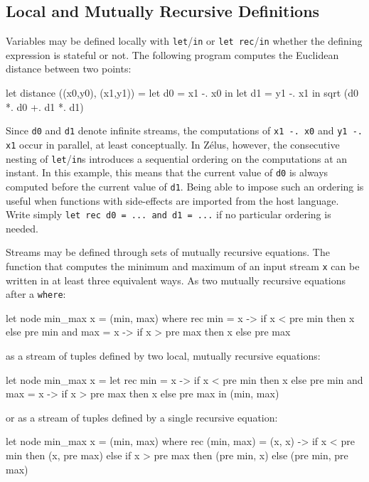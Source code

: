 \documentclass[11pt,titlepage,twoside]{report}
\newcommand{\zls}[1]{\texttt{#1}}
\begin{document}

\subsection{Local and Mutually Recursive Definitions\label{localdefmut}} %

Variables may be defined locally with \zls{let}/\zls{in} or
\zls{let rec}/\zls{in} whether the defining expression is stateful or not.
The following
program computes the Euclidean distance between two points:%
\begin{chklisting}
let distance ((x0,y0), (x1,y1)) =
  let d0 = x1 -. x0 in
  let d1 = y1 -. x1 in
  sqrt (d0 *. d0 +. d1 *. d1)
\end{chklisting}
Since \zls{d0} and \zls{d1} denote infinite streams, the computations of 
\verb+x1 -. x0+ and \verb+y1 -. x1+ occur in parallel, at least 
conceptually.
In Zélus, however, the consecutive nesting of \zls{let}/\zls{in}s introduces 
a sequential ordering on the computations at an instant.
In this example, this means that the current value of \zls{d0} is always 
computed before the current value of \zls{d1}.
Being able to impose such an ordering is useful when functions with 
side-effects are imported from the host language.
Write simply \zls{let rec d0 = ... and d1 = ...} if no particular ordering 
is needed.

Streams may be defined through sets of mutually recursive equations.  The
function that computes the minimum and maximum of an input stream
\zls{x} can be written in at least three equivalent ways.
As two mutually recursive equations after a \zls{where}:
\begin{chklisting}
let node min_max x = (min, max) where
  rec min = x -> if x < pre min then x else pre min
  and max = x -> if x > pre max then x else pre max
\end{chklisting}
as a stream of tuples defined by two local, mutually recursive equations:
\begin{chklisting}
let node min_max x =
  let rec min = x -> if x < pre min then x else pre min
  and max = x -> if x > pre max then x else pre max in
  (min, max)
\end{chklisting}
or as a stream of tuples defined by a single recursive equation:
\begin{chklisting}
let node min_max x = (min, max) where
  rec (min, max) = (x, x) -> if x < pre min then (x, pre max)
                             else if x > pre max then (pre min, x)
                             else (pre min, pre max)
\end{chklisting}
\end{document}
